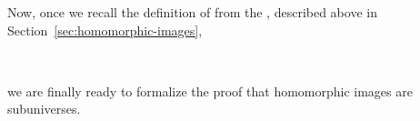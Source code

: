 \documentclass[a4paper,USenglish,cleveref,autoref,thm-restate]{lipics-v2019}
\begin{document}
Now, once we recall the definition of  from the \homsmodule, described above in Section~\ref{sec:homomorphic-images},
\begin{code}
\>[0]\AgdaSpace{}%
\AgdaSymbol{:}\AgdaSpace{}%
\AgdaSymbol{\{}\AgdaSpace{}%
\AgdaSymbol{:}\AgdaSpace{}%
\AgdaSpace{}%
\AgdaSpace{}%
\AgdaSymbol{\}(}\AgdaSpace{}%
\AgdaSymbol{:}\AgdaSpace{}%
\AgdaSpace{}%
\AgdaSpace{}%
\AgdaSymbol{)(}\AgdaSpace{}%
\AgdaSymbol{:}\AgdaSpace{}%
\AgdaSpace{}%
\AgdaSpace{}%
\AgdaSymbol{)}\AgdaSpace{}%
\AgdaSpace{}%
\AgdaSpace{}%
\AgdaSpace{}%
\AgdaSpace{}%
\AgdaSpace{}%
\AgdaSpace{}%
\<%
\\
\>[0]\AgdaSpace{}%
\AgdaSpace{}%
\AgdaSpace{}%
\AgdaSymbol{=}\AgdaSpace{}%
\AgdaSpace{}%
\AgdaSpace{}%
\AgdaSpace{}%
\AgdaSpace{}%
\AgdaSpace{}%
\AgdaSpace{}%
\AgdaSpace{}%
\AgdaSpace{}%
\<%
\end{code}
we are finally ready to formalize the proof that homomorphic images are subuniverses.
\begin{code}\end{code}
\end{document}
